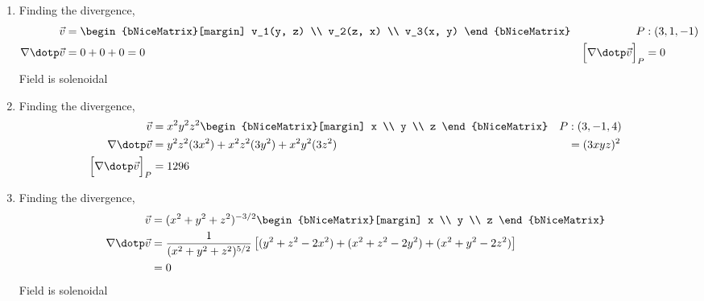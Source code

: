 \begin{enumerate}
    \item Finding the divergence,
          \begin{align}
              \vec{v}                             & =
              \begin{bNiceMatrix}[margin]
                  v_1(y, z) \\ v_2(z, x) \\ v_3(x, y)
              \end{bNiceMatrix} &
              P                                   & : (3, 1, -1)       \\
              \nabla \dotp \vec{v}                & = 0  + 0 + 0 = 0 &
              \Big[\nabla \dotp \vec{v}\Big]_P    & = 0
          \end{align}
          Field is solenoidal

    \item Finding the divergence,
          \begin{align}
              \vec{v}                          & = x^2y^2z^2
              \begin{bNiceMatrix}[margin]
                  x \\ y \\ z
              \end{bNiceMatrix}      &
              P                                & : (3, -1, 4)                  \\
              \nabla \dotp \vec{v}             & = y^2z^2(3x^2) + x^2z^2(3y^2)
              + x^2y^2(3z^2)                   &
                                               & = (3xyz)^2                    \\
              \Big[\nabla \dotp \vec{v}\Big]_P & = 1296
          \end{align}

    \item Finding the divergence,
          \begin{align}
              \vec{v}              & = (x^2 + y^2 + z^2)^{-3/2}
              \begin{bNiceMatrix}[margin]
                  x \\ y \\ z
              \end{bNiceMatrix}                        \\
              \nabla \dotp \vec{v} & = \frac{1}
              {(x^2 + y^2 + z^2)^{5/2}} \left[ (y^2 + z^2 - 2x^2) + (x^2 + z^2 - 2y^2)
              + (x^2 + y^2 - 2z^2) \right]                      \\
                                   & = 0
          \end{align}
          Field is solenoidal


\end{enumerate}
